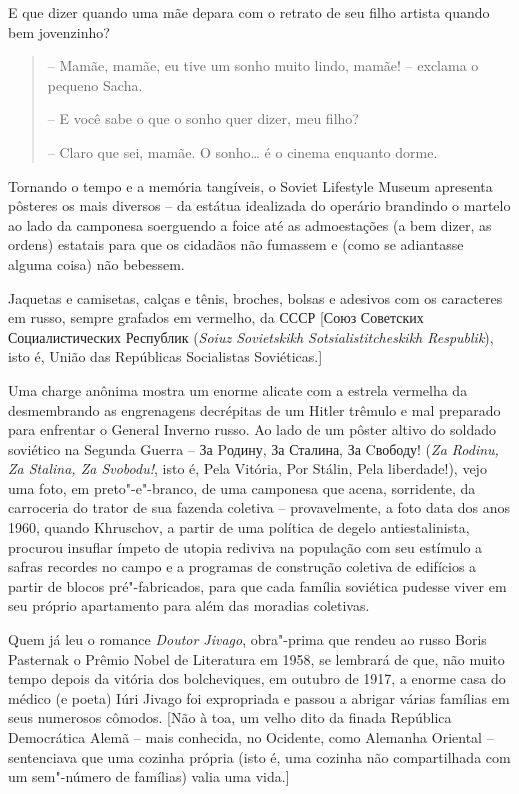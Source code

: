 E que dizer quando uma mãe depara com o retrato de seu filho artista
quando bem jovenzinho?

\begin{quote}
\forceindent{}-- Mamãe, mamãe, eu tive um sonho muito lindo, mamãe! -- exclama o
pequeno Sacha.

-- E você sabe o que o sonho quer dizer, meu filho?

-- Claro que sei, mamãe. O sonho\ldots{} é o cinema enquanto dorme.
\end{quote}

Tornando o tempo e a memória tangíveis, o Soviet Lifestyle Museum
apresenta pôsteres os mais diversos -- da estátua idealizada do operário
brandindo o martelo ao lado da camponesa soerguendo a foice até as
admoestações (a bem dizer, as ordens) estatais para que os cidadãos não
fumassem e (como se adiantasse alguma coisa) não bebessem.

Jaquetas e camisetas, calças e tênis, broches, bolsas e adesivos com os
caracteres em russo, sempre grafados em vermelho, da СССР {[}Союз
Советских Социалистических Республик (\emph{Soiuz Sovietskikh
Sotsialistitcheskikh Respublik}), isto é, União das Repúblicas
Socialistas Soviéticas.{]}

Uma charge anônima mostra um enorme alicate com a estrela vermelha da
 desmembrando as engrenagens decrépitas de um Hitler trêmulo e mal
preparado para enfrentar o General Inverno russo. Ao lado de um pôster
altivo do soldado soviético na Segunda Guerra -- За
Pодину, За Сталина, За Cвободу! (\emph{Za Rodinu, Za Stalina, Za Svobodu!}, isto é, Pela
Vitória, Por Stálin, Pela liberdade!), vejo uma foto, em preto"-e"-branco,
de uma camponesa que acena, sorridente, da carroceria do trator de sua
fazenda coletiva -- provavelmente, a foto data dos anos 1960, quando
Khruschov, a partir de uma política de degelo antiestalinista, procurou
insuflar ímpeto de utopia rediviva na população com seu estímulo a
safras recordes no campo e a programas de construção coletiva de
edifícios a partir de blocos pré"-fabricados, para que cada família
soviética pudesse viver em seu próprio apartamento para além das
moradias coletivas.

Quem já leu o romance \emph{Doutor Jivago}, obra"-prima que rendeu ao
russo Boris Pasternak o Prêmio Nobel de Literatura em 1958, se lembrará
de que, não muito tempo depois da vitória dos bolcheviques, em outubro
de 1917, a enorme casa do médico (e poeta) Iúri Jivago foi expropriada e
passou a abrigar várias famílias em seus numerosos cômodos. {[}Não à
toa, um velho dito da finada República Democrática Alemã -- mais
conhecida, no Ocidente, como Alemanha Oriental -- sentenciava que uma
cozinha própria (isto é, uma cozinha não compartilhada com um sem"-número
de famílias) valia uma vida.{]}

